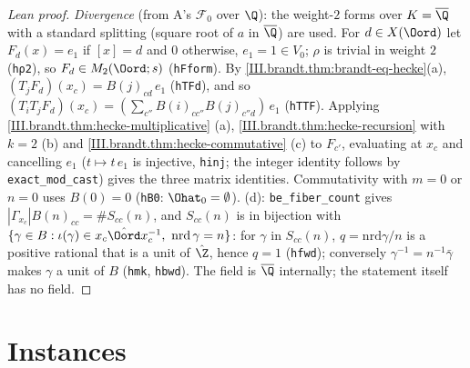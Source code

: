 \begin{proof}[Lean proof]
\emph{Divergence} (from A's $\mathcal F_0$ over $\Q$): the weight-$2$ forms over $K=\overline{\Q}$ with a standard splitting (square root of $a$ in $\overline{\Q}$) are used. For $d\in X(\Oord)$ let $F_d(x)=e_1$ if $[x]=d$ and $0$ otherwise, $e_1=1\in V_0$; $\rho$ is trivial in weight $2$ (\texttt{hρ2}), so $F_d\in M_2(\Oord;s)$ (\texttt{hFform}). By \cref{III.brandt.thm:brandt-eq-hecke}(a), $(T_jF_d)(x_c)=B(j)_{cd}\,e_1$ (\texttt{hTFd}), and so $(T_iT_jF_d)(x_c)=(\sum_{c''}B(i)_{cc''}B(j)_{c''d})\,e_1$ (\texttt{hTTF}). Applying \cref{III.brandt.thm:hecke-multiplicative} (a), \cref{III.brandt.thm:hecke-recursion} with $k=2$ (b) and \cref{III.brandt.thm:hecke-commutative} (c) to $F_{c'}$, evaluating at $x_c$ and cancelling $e_1$ ($t\mapsto t\,e_1$ is injective, \texttt{hinj}; the integer identity follows by \texttt{exact\_mod\_cast}) gives the three matrix identities. Commutativity with $m=0$ or $n=0$ uses $B(0)=0$ (\texttt{hB0}: $\Ohat_0=\emptyset$). (d): \texttt{be\_fiber\_count} gives $|\Gamma_{x_c}|B(n)_{cc}=\#S_{cc}(n)$, and $S_{cc}(n)$ is in bijection with $\{\gamma\in B:\iota(\gamma)\in x_c\hat{\Oord}x_c^{-1},\ \mathrm{nrd}\,\gamma=n\}$: for $\gamma$ in $S_{cc}(n)$, $q=\mathrm{nrd}\gamma/n$ is a positive rational that is a unit of $\hat\Z$, hence $q=1$ (\texttt{hfwd}); conversely $\gamma^{-1}=n^{-1}\bar\gamma$ makes $\gamma$ a unit of $B$ (\texttt{hmk}, \texttt{hbwd}). The field is $\overline{\Q}$ internally; the statement itself has no field.
\end{proof}

\section{Instances}\label{sec:brandt-instances}

